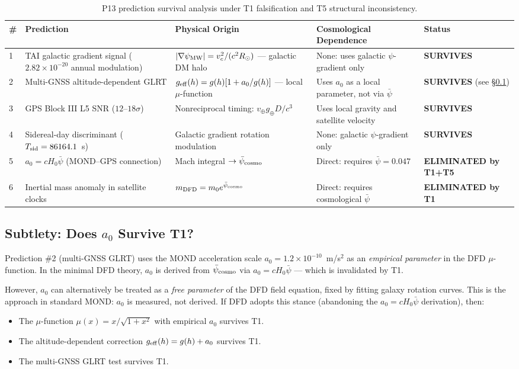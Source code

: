 \documentclass[aps,prd,twocolumn,superscriptaddress,nofootinbib]{revtex4-2}
\newcommand{\ee}[1]{\times 10^{#1}}
\begin{document}
\begin{table}[ht]
\centering
\caption{P13 prediction survival analysis under T1 falsification and
T5 structural inconsistency.}
\label{tab:survival}
\begin{tabular}{p{0.3cm}p{4cm}p{3cm}p{2.5cm}p{2.5cm}}
\toprule
\# & Prediction & Physical Origin & Cosmological Dependence & Status \\
\midrule
1 & TAI galactic gradient signal ($2.82\ee{-20}$ annual modulation) &
  $|\nabla\psi_{\rm MW}| = v_c^2/(c^2 R_\odot)$ --- galactic DM halo &
  None: uses galactic $\psi$-gradient only &
  \textbf{SURVIVES} \\[4pt]
2 & Multi-GNSS altitude-dependent GLRT &
  $g_{\rm eff}(h) = g(h)[1 + a_0/g(h)]$ --- local $\mu$-function &
  Uses $a_0$ as a local parameter, not via $\bar{\psi}$ &
  \textbf{SURVIVES} (see \S\ref{subsec:a0}) \\[4pt]
3 & GPS Block III L5 SNR ($12$--$18\sigma$) &
  Nonreciprocal timing: $v_\oplus g_\oplus D/c^3$ &
  Uses local gravity and satellite velocity &
  \textbf{SURVIVES} \\[4pt]
4 & Sidereal-day discriminant ($T_{\rm sid} = 86164.1$~s) &
  Galactic gradient rotation modulation &
  None: galactic $\psi$-gradient only &
  \textbf{SURVIVES} \\[4pt]
5 & $a_0 = cH_0\bar{\psi}$ (MOND--GPS connection) &
  Mach integral $\to \bar{\psi}_{\rm cosmo}$ &
  Direct: requires $\bar{\psi} = 0.047$ &
  \textbf{ELIMINATED by T1+T5} \\[4pt]
6 & Inertial mass anomaly in satellite clocks &
  $m_{\rm DFD} = m_0 e^{\bar{\psi}_{\rm cosmo}}$ &
  Direct: requires cosmological $\bar{\psi}$ &
  \textbf{ELIMINATED by T1} \\
\bottomrule
\end{tabular}
\end{table}

\subsection{Subtlety: Does $a_0$ Survive T1?}
\label{subsec:a0}

Prediction \#2 (multi-GNSS GLRT) uses the MOND acceleration scale
$a_0 = 1.2\ee{-10}$~m/s$^2$ as an \emph{empirical parameter} in the
DFD $\mu$-function. In the minimal DFD theory, $a_0$ is derived from
$\bar{\psi}_{\rm cosmo}$ via $a_0 = cH_0\bar{\psi}$ --- which is
invalidated by T1.

However, $a_0$ can alternatively be treated as a \emph{free parameter}
of the DFD field equation, fixed by fitting galaxy rotation curves.
This is the approach in standard MOND: $a_0$ is measured, not derived.
If DFD adopts this stance (abandoning the $a_0 = cH_0\bar{\psi}$
derivation), then:
\begin{itemize}
\item The $\mu$-function $\mu(x) = x/\sqrt{1+x^2}$ with empirical
  $a_0$ survives T1.
\item The altitude-dependent correction $g_{\rm eff}(h) = g(h) + a_0$
  survives T1.
\item The multi-GNSS GLRT test survives T1.
\end{itemize}
\end{document}
